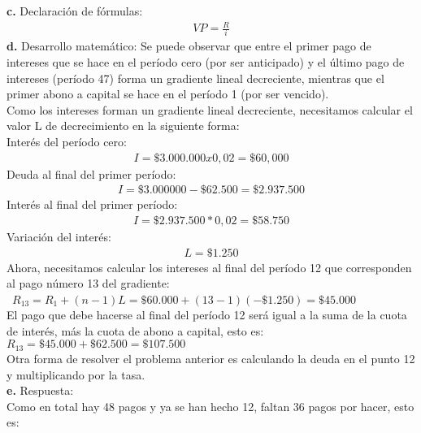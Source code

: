 \textbf{c.}	Declaración de fórmulas:
\begin{align*}
	VP=\frac{R}{i}
\end{align*}
\textbf{d.} Desarrollo matemático:
Se puede observar que entre el primer pago de intereses que se hace en el período cero (por ser anticipado) y el último pago de intereses (período 47) forma un gradiente lineal decreciente, mientras que el primer abono a capital se hace en el período 1 (por ser vencido).\\

Como los intereses forman un gradiente lineal decreciente, necesitamos calcular el valor L de decrecimiento en la siguiente forma:\\

Interés del período cero: 
\begin{align*}
	I=\$ 3.000.000x0,02= \$60,000
\end{align*}
Deuda al final del primer período:
\begin{align*}
	I=\$ 3.000 000-\$ 62.500= \$ 2.937.500
\end{align*}
Interés al final del primer período: 
\begin{align*}
	I=\$ 2.937.500* 0,02= \$58.750
\end{align*}
Variación del interés:
\begin{align*}
	L= \$1.250
\end{align*}
Ahora, necesitamos calcular los intereses al final del período 12 que corresponden al pago número 13 del gradiente:\\

\
	$R_{13}=R_{1}  + (n-1)L=\$60.000 + (13 -1)( -\$1. 250)= \$45.000$\\
	

El pago que debe hacerse al final del período 12 será igual a la suma de la cuota de interés, más la cuota de abono a capital, esto es:\\


    $R_{13}=\$ 45.000 +\$ 62.500= \$107.500$\\
    

Otra forma de resolver el problema anterior es calculando la deuda en el punto 12 y multiplicando por la tasa.\\

\textbf{e.}	Respuesta:\\

Como en total hay 48 pagos y ya se han hecho 12, faltan 36 pagos por hacer, esto es:\\



